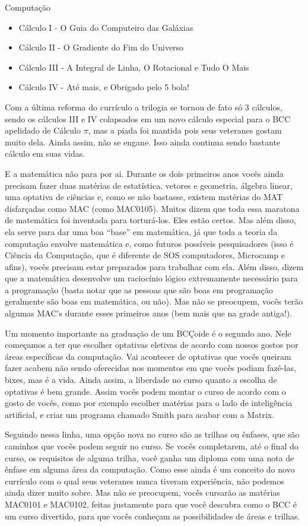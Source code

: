 \begin{subsecao}{Computação}
\begin{itemize}
\item Cálculo I - O Guia do Computeiro das Galáxias
\item Cálculo II - O Gradiente do Fim do Universo
\item Cálculo III - A Integral de Linha, O Rotacional e Tudo O Mais
\item Cálculo IV - Até mais, e Obrigado pelo 5 bola!
\end{itemize}

Com a última reforma do currículo a trilogia se tornou de fato só 3 cálculos,
sendo os cálculos III e IV colapsados em um novo cálculo especial para o BCC 
apelidado de Cálculo $\pi$, mas a piada foi mantida pois seus veteranes gostam muito
dela. Ainda assim, não se engane. Isso ainda continua sendo bastante cálculo em
suas vidas.

E a matemática não para por ai. Durante os dois primeiros anos vocês ainda
precisam fazer duas matérias de estatística, vetores e geometria, álgebra
linear, uma optativa de ciências e, como se não bastasse, existem matérias do
MAT disfarçadas como MAC (como MAC0105). Muitos dizem que toda essa maratona de
matemática foi inventada para torturá-los. Eles estão certos. Mas além disso,
ela serve para dar uma boa ``base'' em matemática, já que toda a teoria da
computação envolve matemática e, como futuros possíveis pesquisadores (isso é
Ciência da Computação, que é diferente de SOS computadores, Microcamp e afins),
vocês precisam estar preparados para trabalhar com ela. Além disso, dizem que a
matemática desenvolve um raciocínio lógico extremamente necessário para a
programação (basta notar que as pessoas que são boas em programação geralmente
são boas em matemática, ou não). Mas não se preocupem, vocês terão algumas MAC's
durante esses primeiros anos (bem mais que na grade antiga!).

Um momento importante na graduação de um BCÇoide é o segundo ano. Nele começamos
a ter que escolher optativas eletivas de acordo com nossos gostos por áreas
específicas da computação. Vai acontecer de optativas que vocês queiram fazer
acabem não sendo oferecidas nos momentos em que vocês podiam fazê-las, bixes,
mas é a vida. Ainda assim, a liberdade no curso quanto a escolha de optativas é
bem grande. Assim vocês podem montar o curso de acordo com o gosto de vocês,
como por exemplo escolher matérias para o lado de inteligência artificial, e
criar um programa chamado Smith para acabar com a Matrix.

Seguindo nessa linha, uma opção nova no curso são as trilhas ou ênfases, que
são caminhos que vocês podem seguir no curso. Se vocês completarem, até o final
do curso, os requisitos de alguma trilha, você ganha um diploma com uma nota de
ênfase em alguma área da computação. Como esse ainda é um conceito do novo
currículo com o qual seus veteranes nunca tiveram experiência, não podemos
ainda dizer muito sobre. Mas não se preocupem, vocês cursarão as matérias
MAC0101 e MAC0102, feitas justamente para que você descubra como o BCC é um
curso divertido, para que vocês conheçam as possibilidades de áreas e trilhas.


\end{subsecao}
